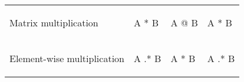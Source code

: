 \documentclass[10pt, landscape]{article}
\newenvironment{Shaded}{}{}
\newcommand{\OperatorTok}[1]{\textcolor[rgb]{0.40,0.40,0.40}{{#1}}}
\newcommand{\NormalTok}[1]{{#1}}
\begin{document}
\begin{multicols*}{2}
\begin{table}[ht]
\begin{tabular}[ ]{@{}llll@{}}
\begin{minipage}[t]{0.23\columnwidth}
Matrix multiplication\strut
\end{minipage} & \begin{minipage}[t]{0.22\columnwidth}\raggedright\strut
\begin{Shaded}
\begin{Highlighting}[]
\NormalTok{A * B}
\end{Highlighting}
\end{Shaded}
\strut
\end{minipage} & \begin{minipage}[t]{0.23\columnwidth}\raggedright\strut
\begin{Shaded}
\begin{Highlighting}[]
\NormalTok{A @ B}
\end{Highlighting}
\end{Shaded}
\strut
\end{minipage} & \begin{minipage}[t]{0.20\columnwidth}\raggedright\strut
\begin{Shaded}
\begin{Highlighting}[]
\NormalTok{A * B}
\end{Highlighting}
\end{Shaded}
\strut
\end{minipage}\tabularnewline
\begin{minipage}[t]{0.23\columnwidth}\raggedright\strut
Element-wise multiplication\strut
\end{minipage} & \begin{minipage}[t]{0.22\columnwidth}\raggedright\strut
\begin{Shaded}
\begin{Highlighting}[]
\NormalTok{A .* B}
\end{Highlighting}
\end{Shaded}
\strut
\end{minipage} & \begin{minipage}[t]{0.23\columnwidth}\raggedright\strut
\begin{Shaded}
\begin{Highlighting}[]
\NormalTok{A }\OperatorTok{*} \NormalTok{B}
\end{Highlighting}
\end{Shaded}
\strut
\end{minipage} & \begin{minipage}[t]{0.20\columnwidth}\raggedright\strut
\begin{Shaded}
\begin{Highlighting}[]
\NormalTok{A .* B}
\end{Highlighting}

\end{Shaded}
\end{minipage}
\end{tabular}
\end{table}
\end{multicols*}
\end{document}
